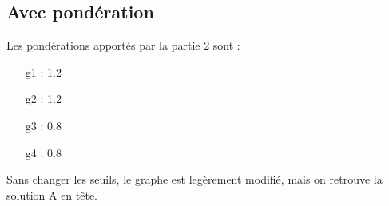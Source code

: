 \subsection{Avec pondération}

Les pondérations apportés par la partie 2 sont :
\begin{itemize}
\item[g1] : 1.2
\item[g2] : 1.2
\item[g3] : 0.8
\item[g4] : 0.8
\end{itemize}

Sans changer les seuils, le graphe est legèrement modifié, mais on retrouve la solution A en tête.